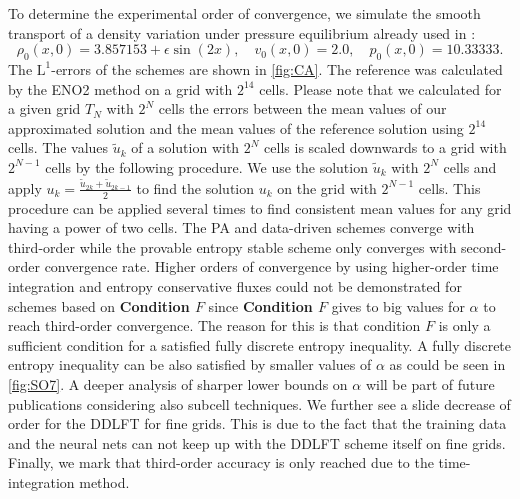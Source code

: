 	To determine the experimental order of convergence, we simulate the smooth transport of a density variation under pressure equilibrium already used in \cite{klein2021using}:
	\[
	\rho_0(x, 0) = 3.857153 + \epsilon \sin(2 x),  \quad v_0(x, 0) =  2.0, \quad p_0(x, 0) = 10.33333.
	\]
	The $\mathrm{L}^1$-errors of the schemes are shown in  \cref{fig:CA}. The reference was calculated by the ENO2 method  on a grid with $2^{14}$ cells. Please note that we calculated for a given grid $T_N$ with $2^N$ cells  the errors between the mean values of our approximated solution and the mean values of the reference solution using $2^{14}$ cells. 
	The values $\tilde u_k$ of a solution with $2^N$ cells is scaled  downwards to a grid with $2^{N-1}$ cells by the following procedure. We use the solution $\tilde u_k$ with $2^N$ cells and apply $ u_k = \frac{\tilde u_{2k} + \tilde u_{2k-1}}{2}$ to find the solution $u_k$ on the grid with $2^{N-1}$ cells. This procedure can be applied several times to find consistent mean values for any grid having a power of two cells. 
	The PA and data-driven schemes converge with third-order while the provable entropy stable scheme only converges with second-order convergence rate. Higher orders of convergence by using higher-order time integration and entropy conservative fluxes could not be demonstrated for schemes based on \textbf{Condition $F$} since  \textbf{Condition $F$} gives to big values for $\alpha$ to reach third-order convergence. The reason for this is that condition $F$ is only a sufficient condition for a satisfied fully discrete entropy inequality. A fully discrete entropy inequality can be also satisfied by smaller values of $\alpha$ as could be seen in \cref{fig:SO7}. A deeper analysis of sharper lower bounds on $\alpha$ will be part of future publications considering also subcell techniques. We further see a slide decrease of order for the DDLFT for fine grids. This is due to the fact that the training  data and the neural nets can not keep up with the DDLFT scheme itself on fine grids. 
	Finally,  we mark that third-order accuracy is only reached due to the time-integration method. 

	
	
